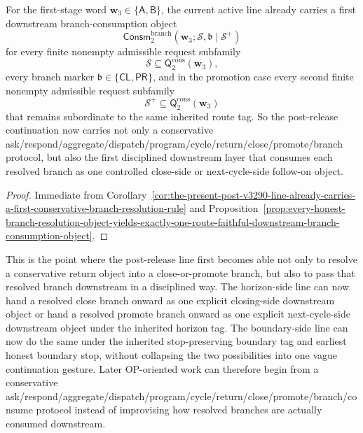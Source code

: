 \begin{corollary}
\label{cor:the-present-post-v3290-line-already-carries-a-first-downstream-branch-consumption-layer}
For the first-stage word \(\mathbf w_3\in\{\mathsf A,\mathsf B\}\), the current active line already carries a first downstream branch-consumption object
\[
 \mathsf{Consm}^{\mathrm{branch}}_{2}(\mathbf w_3;\mathcal S,\mathfrak b\mid\mathcal S^{+})
\]
for every finite nonempty admissible request subfamily
\[
 \mathcal S\subseteq \mathsf{Q}^{\mathrm{cons}}_{2}(\mathbf w_3),
\]
every branch marker \(\mathfrak b\in\{\mathsf{CL},\mathsf{PR}\}\), and in the promotion case every second finite nonempty admissible request subfamily
\[
 \mathcal S^{+}\subseteq \mathsf{Q}^{\mathrm{cons}}_{2}(\mathbf w_3)
\]
that remains subordinate to the same inherited route tag. So the post-release continuation now carries not only a conservative ask/respond/aggregate/dispatch/program/cycle/return/close/promote/branch protocol, but also the first disciplined downstream layer that consumes each resolved branch as one controlled close-side or next-cycle-side follow-on object.
\end{corollary}

\begin{proof}
Immediate from Corollary~\ref{cor:the-present-post-v3290-line-already-carries-a-first-conservative-branch-resolution-rule} and Proposition~\ref{prop:every-honest-branch-resolution-object-yields-exactly-one-route-faithful-downstream-branch-consumption-object}.
\end{proof}

\begin{remark}
\label{rem:what-the-first-downstream-branch-consumption-layer-now-buys}
This is the point where the post-release line first becomes able not only to resolve a conservative return object into a close-or-promote branch, but also to pass that resolved branch downstream in a disciplined way. The horizon-side line can now hand a resolved close branch onward as one explicit closing-side downstream object or hand a resolved promote branch onward as one explicit next-cycle-side downstream object under the inherited horizon tag. The boundary-side line can now do the same under the inherited stop-preserving boundary tag and earliest honest boundary stop, without collapsing the two possibilities into one vague continuation gesture. Later OP-oriented work can therefore begin from a conservative ask/respond/aggregate/dispatch/program/cycle/return/close/promote/branch/consume protocol instead of improvising how resolved branches are actually consumed downstream.
\end{remark}




